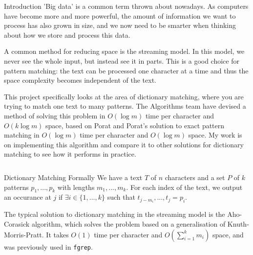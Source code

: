 \documentclass[ %
                    author={Dominic Moylett},
                supervisor={Dr. Raphael Clifford and Dr. Benjamin Sach},
                    degree={MEng},
                     title={Dictionary Matching with Fingerprints},
                  subtitle={},
                      type={Research},
                      year={2015} ]{poster}
\newcommand{\nline}{
  \\\vspace{\baselineskip}
}
\begin{document}

\begin{frame}{} 

\vfill

\begin{columns}[t]
  \begin{column}{0.900\linewidth}
  \begin{block}{\Large Introduction}
  'Big data' is a common term thrown about nowadays. As computers have become more and more powerful, the amount of information we want to process has also grown in size, and we now need to be smarter when thinking about how we store and process this data.\nline

  A common method for reducing space is the streaming model. In this model, we never see the whole input, but instead see it in parts. This is a good choice for pattern matching: the text can be processed one character at a time and thus the space complexity becomes independent of the text.\nline

  This project specifically looks at the area of dictionary matching, where you are trying to match one text to many patterns. The Algorithms team have devised a method of solving this problem in $O(\log m)$ time per character and $O(k\log m)$ space, based on Porat and Porat's solution to exact pattern matching in $O(\log m)$ time per character and $O(\log m)$ space. My work is on implementing this algorithm and compare it to other solutions for dictionary matching to see how it performs in practice.
  \end{block}
  \end{column}
\end{columns}

\vfill

\begin{columns}[t]
  \begin{column}{0.422\linewidth}
  \begin{block}{\Large Dictionary Matching Formally}
  We have a text $T$ of $n$ characters and a set $P$ of $k$ patterns $p_1,...,p_k$ with lengths $m_1,...,m_k$. For each index of the text, we output an occurance at $j$ if $\exists i \in \{1,...,k\}$ such that $t_{j - m_i},...,t_j = p_i$.\nline

  The typical solution to dictionary matching in the streaming model is the Aho-Corasick algorithm, which solves the problem based on a generalisation of Knuth-Morris-Pratt. It takes $O(1)$ time per character and $O(\sum_{i =1}^km_i)$ space, and was previously used in \texttt{fgrep}.
  \end{block}
  \end{column}


\end{columns}
\end{frame}
\end{document}
